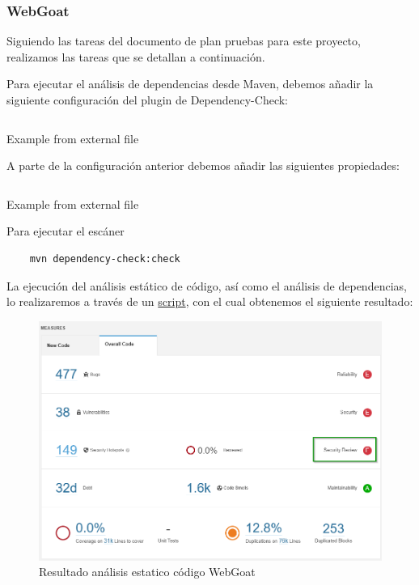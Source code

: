 \subsubsection{WebGoat}
Siguiendo las tareas del documento de plan pruebas para este proyecto, realizamos las tareas que se detallan a continuación.

Para ejecutar el análisis de dependencias desde Maven, debemos añadir la siguiente configuración del plugin de Dependency-Check:

\begin{listing}[h]
    \inputminted{xml}{./Ficheros/ConfiguracionPlugin_Maven.xml}
    \caption{Example from external file}
    \label{listing:4}
\end{listing}

A parte de la configuración anterior debemos añadir las siguientes propiedades:\\

\begin{listing}[h]
    \inputminted{xml}{./Ficheros/ConfigPropertiesPlugin_maven.xml}
    \caption{Example from external file}
    \label{listing:5}
\end{listing}

Para ejecutar el escáner\\

\begin{verbatim}
    mvn dependency-check:check
\end{verbatim}

La ejecución del análisis estático de código, así como el análisis de dependencias, lo realizaremos a través de un 
\href{https://github.com/M0l1n3ta/PFG/blob/master/Scripts/STAT/RunSonarScaner_WebGoat.ps1}{script}, con el cual
obtenemos el siguiente resultado:\\

\begin{figure}[h!]  
    \includegraphics[width=\linewidth]{./imagenes/09_AnalisisEstatico_WebGoat.png}
    \caption{Resultado análisis estatico código WebGoat}  
    \label{fig:9}
\end{figure}

